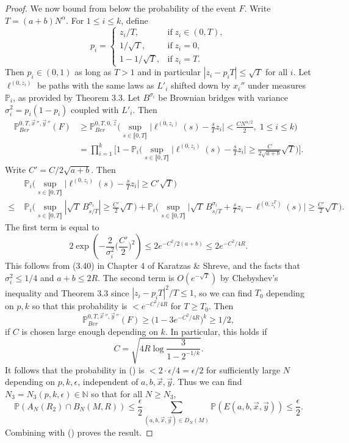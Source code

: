 \documentclass[12pt]{article}
\begin{document}
\begin{proof}
		We now bound from below the probability of the event $F$. Write $T = (a+b)N^\alpha$. For $1\leq i\leq k$, define
		\[
		p_i = \begin{cases}
		z_i/T, & \mathrm{if}\;z_i \in (0,T),\\
		1/\sqrt{T}, & \mathrm{if}\;z_i = 0,\\
		1 - 1/\sqrt{T}, & \mathrm{if}\;z_i = T.
		\end{cases}
		\] 
		Then $p_i\in(0,1)$ as long as $T>1$ and in particular $|z_i - p_i T|\leq \sqrt{T}$ for all $i$. Let $\ell^{(0,z_i)}$ be paths with the same laws as $L'_i$ shifted down by $x_i{}''$ under measures $\mathbb{P}_i$, as provided by Theorem 3.3. Let $B^{\sigma_i}$ be Brownian bridges with variance $\sigma_i^2 = p_i(1-p_i)$ coupled with $L'_i$. Then
		\begin{align*}
		\mathbb{P}^{0,T,\vec{x}\,'', \vec{y}\,''}_{Ber}(F) &\geq \mathbb{P}^{0,T,0,\vec{z}}_{Ber} \Big( \sup_{s\in\llbracket 0, T\rrbracket} \Big|\ell^{(0,z_i)}(s) - \frac{s}{T}z_i\Big| < \frac{CN^{\alpha/2}}{2},\; 1\leq i\leq k \Big)\\
		&= \prod_{i=1}^k \Big[ 1 - \mathbb{P}_i \Big( \sup_{s\in\llbracket 0, T\rrbracket} \Big|\ell^{(0,z_i)}(s) - \frac{s}{T}z_i\Big| \geq \frac{C}{2\sqrt{a+b}}\sqrt{T} \Big) \Big].
		\end{align*}
		Write $C' = C/2\sqrt{a+b}$. Then
		\begin{align*}
		&\mathbb{P}_i \Big( \sup_{s\in\llbracket 0, T\rrbracket} \Big|\ell^{(0,z_i)}(s) - \frac{s}{T}z_i\Big| \geq C'\sqrt{T} \Big)\\
		\leq \; & \mathbb{P}_i \Big( \sup_{s\in\llbracket 0, T\rrbracket} |\sqrt{T}\,B^{\sigma_i}_{s/T}| \geq \frac{C'}{2}\sqrt{T}\Big) + \mathbb{P}_i \Big( \sup_{s\in\llbracket 0, T\rrbracket} \Big|\sqrt{T}\,B^{\sigma_i}_{s/T} + \frac{s}{T}z_i - \ell^{(0,z_i^T)}(s)\Big| \geq \frac{C'}{2}\sqrt{T} \Big).
		\end{align*}
		The first term is equal to
		\[
		2\exp\left( - \frac{2}{\sigma_i^2}\Big(\frac{C'}{2}\Big)^2\right) \leq 2e^{-C^2/2(a+b)} \leq 2e^{-C^2/4R}.
		\]
		This follows from (3.40) in Chapter 4 of Karatzas \& Shreve, and the facts that $\sigma_i^2 \leq 1/4$ and $a+b\leq 2R$. The second term is $O(e^{-\sqrt{T}})$ by Chebyshev's inequality and Theorem 3.3 since $|z_i-p_iT|^2/T \leq 1$, so we can find $T_0$ depending on $p,k$ so that this probability is $< e^{-C^2/4R}$ for $T\geq T_0$. Then
		\[
		\mathbb{P}^{0,T,\vec{x}\,'',\vec{y}\,''}_{Ber}(F) \geq \big(1 - 3e^{-C^2/4R}\big)^k \geq 1/2,
		\]
		if $C$ is chosen large enough depending on $k$. In particular, this holds if
		\[
		C = \sqrt{4R\log\frac{3}{1-2^{-1/k}}}.
		\]
		It follows that the probability in () is $< 2\cdot \epsilon/4 = \epsilon/2$ for sufficiently large $N$ depending on $p,k,\epsilon$, independent of $a,b,\vec{x},\vec{y}$. Thus we can find $N_3 = N_3(p,k,\epsilon)\in\mathbb{N}$ so that for all $N\geq N_3$,
		\[
		\mathbb{P}(A_N(R_2)\cap B_N(M,R)) \leq \frac{\epsilon}{2}\sum_{(a,b,\vec{x},\vec{y})\in D_N(M)} \mathbb{P}(E(a,b,\vec{x},\vec{y})) \leq \frac{\epsilon}{2}.
		\]
		Combining with () proves the result.
		
	\end{proof}
	
	
	
\end{document}
